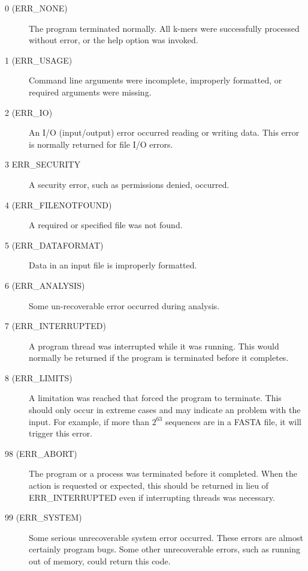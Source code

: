 \begin{description}
\item[0 (ERR\_NONE)] The program terminated normally. All k-mers were successfully processed without error, or the help option was invoked.

\item[1 (ERR\_USAGE)] Command line arguments were incomplete, improperly formatted, or required arguments were missing.

\item[2 (ERR\_IO)] An I/O (input/output) error occurred reading or writing data. This error is normally returned for file I/O errors.

\item[3 ERR\_SECURITY] A security error, such as permissions denied, occurred.

\item[4 (ERR\_FILENOTFOUND)] A required or specified file was not found.

\item[5 (ERR\_DATAFORMAT)] Data in an input file is improperly formatted. 

\item[6 (ERR\_ANALYSIS)] Some un-recoverable error occurred during analysis.

\item[7 (ERR\_INTERRUPTED)] A program thread was interrupted while it was running. This would normally be returned if the program is terminated before it completes.

\item[8 (ERR\_LIMITS)] A limitation was reached that forced the program to terminate. This should only occur in extreme cases and may indicate an problem with the input. For example, if more than $2^{63}$ sequences are in a FASTA file, it will trigger this error.

\item[98 (ERR\_ABORT)] The program or a process was terminated before it completed. When the action is requested or expected, this should be returned in lieu of ERR\_INTERRUPTED even if interrupting threads was necessary.

\item[99 (ERR\_SYSTEM)] Some serious unrecoverable system error occurred. These errors are almost certainly program bugs. Some other unrecoverable errors, such as running out of memory, could return this code.

\end{description}


